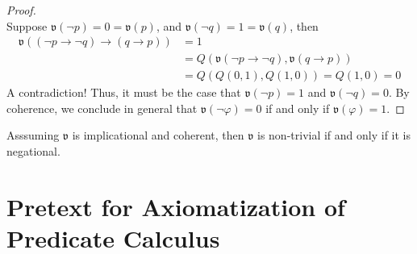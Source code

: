 \documentclass{treatise}
\begin{document}
\begin{shaded}
\begin{proof}
\\
Suppose $\mathfrak{v}(\neg p) = 0 = \mathfrak{v}(p)$, and $\mathfrak{v}(\neg q) = 1 = \mathfrak{v}(q)$, then
\begin{align*}
    \mathfrak{v}((\neg p \to \neg q) \to (q \to p)) & = 1
    \\
    & = Q(\mathfrak{v}(\neg p \to \neg q), \mathfrak{v}(q \to p))
    \\
    & = Q(Q(0, 1), Q(1, 0)) = Q(1, 0) = 0
\end{align*}
A contradiction! Thus, it must be the case that $\mathfrak{v}(\neg p) = 1$ and $\mathfrak{v}(\neg q) = 0$. By coherence, we conclude in general that $\mathfrak{v}(\neg \varphi) = 0$ if and only if $\mathfrak{v} (\varphi) = 1$.
\end{proof}
\begin{corollary}
Asssuming $\mathfrak{v}$ is implicational and coherent, then $\mathfrak{v}$ is non-trivial if and only if it is negational.
\end{corollary}

\newpage

\section{Pretext for Axiomatization of Predicate Calculus}

\end{shaded}
\end{document}
